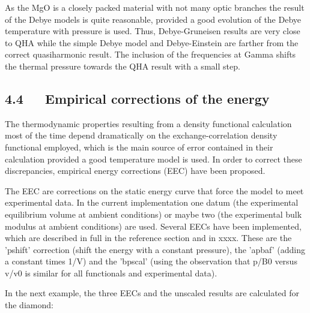 \documentclass[a4paper]{article}
\begin{document}
As the MgO is a closely packed material with not many optic branches
the result of the Debye models is quite reasonable, provided a good
evolution of the Debye temperature with pressure is used. Thus,
Debye-Gruneisen results are very close to QHA while the simple Debye
model and Debye-Einstein are farther from the correct quasiharmonic
result. The inclusion of the frequencies at Gamma shifts the thermal
pressure towards the QHA result with a small step.


\subsection{4.4   Empirical corrections of the energy%
  \label{empirical-corrections-of-the-energy}%
}

The thermodynamic properties resulting from a density functional
calculation most of the time depend dramatically on the
exchange-correlation density functional employed, which is the main
source of error contained in their calculation provided a good
temperature model is used. In order to correct these discrepancies,
empirical energy corrections (EEC) have been proposed.

The EEC are corrections on the static energy curve that force the
model to meet experimental data. In the current implementation one
datum (the experimental equilibrium volume at ambient conditions) or
maybe two (the experimental bulk modulus at ambient conditions) are
used. Several EECs have been implemented, which are described in full
in the reference section and in xxxx. These are the 'pshift'
correction (shift the energy with a constant pressure), the 'apbaf'
(adding a constant times 1/V) and the 'bpscal' (using the observation
that p/B0 versus v/v0 is similar for all functionals and experimental
data).

In the next example, the three EECs and the unscaled results are
calculated for the diamond:
\end{document}
